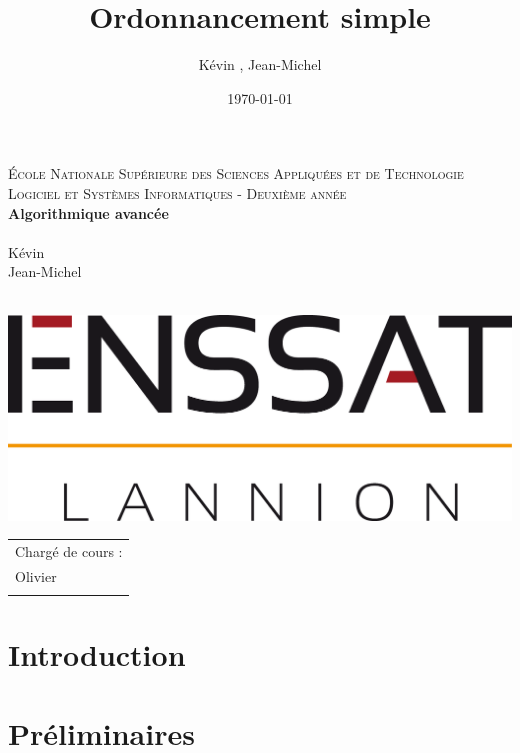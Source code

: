 \documentclass[a4paper, titlepage]{article}
\title{Ordonnancement simple}
\author{Kévin \bsc{Vythelingum}, Jean-Michel \bsc{Nokaya}}
\date{\today}           %
\begin{document}
\makeatletter
  \begin{titlepage}
  \centering
  	{\large \textsc{École Nationale Supérieure des Sciences Appliquées et de Technologie}}\\
	\textsc{Logiciel et Systèmes Informatiques - Deuxième année}\\
  \vfill
	\textbf{Algorithmique avancée}\\
  \vspace{1cm}
        {\LARGE \textbf{\@title}} \\
  \vspace{2em}
  {\large Kévin }\\
  \vspace{0.5cm}
  {\large Jean-Michel } \\
  \vspace{1cm}

	\@date \\
  \vfill
	\includegraphics[height=0.07\textheight]{enssat.png}
	\hfill
	\begin{tabular}{l}
		\large Chargé de cours :\\[0.2cm]
		\large Olivier \bsc{Pivert} \\
		\vspace{1cm}
	\end{tabular}

\end{titlepage}\makeatother
\tableofcontents
\newpage
\large

\section{Introduction}

\section{Préliminaires}
\end{document}
